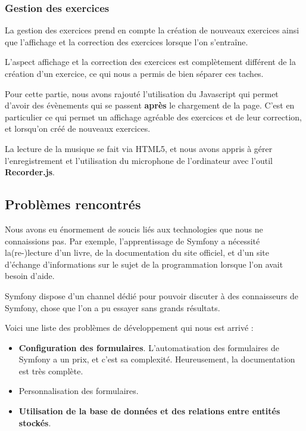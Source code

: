 \documentclass[12pt,a4paper]{report}
\begin{document}
\subsubsection{Gestion des exercices}

La gestion des exercices prend en compte la création de nouveaux exercices
ainsi que l'affichage et la correction des exercices lorsque l'on s'entraîne.

L'aspect affichage et la correction des exercices est complètement différent de
la création d'un exercice, ce qui nous a permis de bien séparer ces taches.

Pour cette partie, nous avons rajouté l'utilisation du Javascript qui permet
d'avoir des évènements qui se passent \textbf{après} le chargement de la page.
C'est en particulier ce qui permet un affichage agréable des exercices et de leur correction, et lorsqu'on créé de nouveaux exercices.

La lecture de la musique se fait via HTML5, et nous avons appris à gérer
l'enregistrement et l'utilisation du microphone de l'ordinateur avec l'outil
\textbf{Recorder.js}\cite{recorderjs}.

\subsection{Problèmes rencontrés}
Nous avons eu énormement de soucis liés aux technologies que nous ne
connaissions pas. Par exemple, l'apprentissage de Symfony a nécessité
la(re-)lecture d'un livre, de la documentation du site officiel, et d'un site
d'échange d'informations\cite{so} sur le sujet de la programmation lorsque l'on
avait besoin d'aide.

Symfony dispose d'un channel dédié\cite{freenode} pour pouvoir discuter à des
connaisseurs de Symfony, chose que l'on a pu essayer sans grands résultats.

Voici une liste des problèmes de développement qui nous est arrivé :

\begin{itemize}
	\item \textbf{Configuration des formulaires}. L'automatisation des 
	formulaires de Symfony a un prix, et c'est sa complexité. Heureusement,
	la documentation\cite{docform} est très complète.
	\item Personnalisation des formulaires. 
	\item \textbf{Utilisation de la base de données et des relations entre
	entités stockés}.
\end{itemize}
\end{document}
